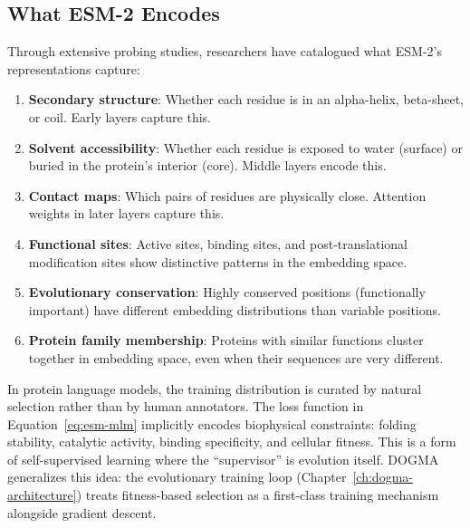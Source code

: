 \subsection{What ESM-2 Encodes}

Through extensive probing studies, researchers have catalogued what ESM-2's representations capture:

\begin{enumerate}[leftmargin=1.8em]
  \item \textbf{Secondary structure}: Whether each residue is in an alpha-helix, beta-sheet, or coil. Early layers capture this.
  \item \textbf{Solvent accessibility}: Whether each residue is exposed to water (surface) or buried in the protein's interior (core). Middle layers encode this.
  \item \textbf{Contact maps}: Which pairs of residues are physically close. Attention weights in later layers capture this.
  \item \textbf{Functional sites}: Active sites, binding sites, and post-translational modification sites show distinctive patterns in the embedding space.
  \item \textbf{Evolutionary conservation}: Highly conserved positions (functionally important) have different embedding distributions than variable positions.
  \item \textbf{Protein family membership}: Proteins with similar functions cluster together in embedding space, even when their sequences are very different.
\end{enumerate}

\begin{dogmadef}
In protein language models, the training distribution is curated by natural selection rather than by human annotators. The loss function in Equation~\ref{eq:esm-mlm} implicitly encodes biophysical constraints: folding stability, catalytic activity, binding specificity, and cellular fitness. This is a form of self-supervised learning where the ``supervisor'' is evolution itself. DOGMA generalizes this idea: the evolutionary training loop (Chapter~\ref{ch:dogma-architecture}) treats fitness-based selection as a first-class training mechanism alongside gradient descent.
\end{dogmadef}

